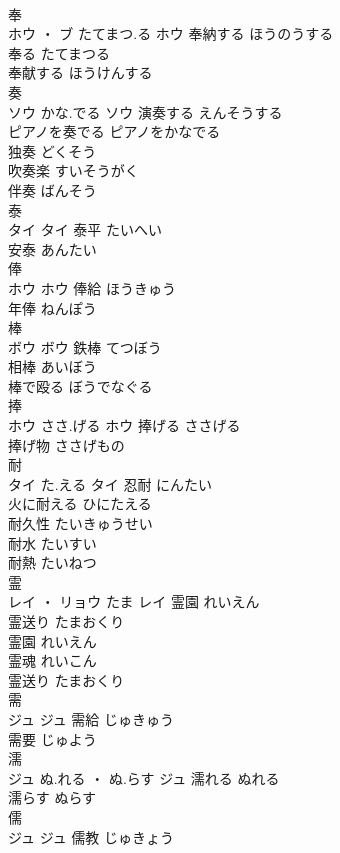 \documentclass[8pt]{extreport}
\begin{document}
\begin{CJK}{UTF8}{min}
\\	奉	
\\	ホウ ・ ブ	たてまつ.る	ホウ	奉納する	ほうのうする	
\\	奉る	たてまつる	
\\	奉献する	ほうけんする	
\\	奏	
\\	ソウ	かな.でる	ソウ	演奏する	えんそうする	
\\	ピアノを奏でる	ピアノをかなでる	
\\	独奏	どくそう	
\\	吹奏楽	すいそうがく	
\\	伴奏	ばんそう	
\\	泰	
\\	タイ		タイ	泰平	たいへい	
\\	安泰	あんたい	
\\	俸	
\\	ホウ		ホウ	俸給	ほうきゅう	
\\	年俸	ねんぽう	
\\	棒	
\\	ボウ		ボウ	鉄棒	てつぼう	
\\	相棒	あいぼう	
\\	棒で殴る	ぼうでなぐる	
\\	捧	
\\	ホウ	ささ.げる	ホウ	捧げる	ささげる	
\\	捧げ物	ささげもの	
\\	耐	
\\	タイ	た.える	タイ	忍耐	にんたい	
\\	火に耐える	ひにたえる	
\\	耐久性	たいきゅうせい	
\\	耐水	たいすい	
\\	耐熱	たいねつ	
\\	霊	
\\	レイ ・ リョウ	たま	レイ	霊園	れいえん	
\\	霊送り	たまおくり	
\\	霊園	れいえん	
\\	霊魂	れいこん	
\\	霊送り	たまおくり	
\\	需	
\\	ジュ		ジュ	需給	じゅきゅう	
\\	需要	じゅよう	
\\	濡	
\\	ジュ	ぬ.れる ・ ぬ.らす	ジュ	濡れる	ぬれる	
\\	濡らす	ぬらす	
\\	儒	
\\	ジュ		ジュ													儒教	じゅきょう	

\end{CJK}
\end{document}
